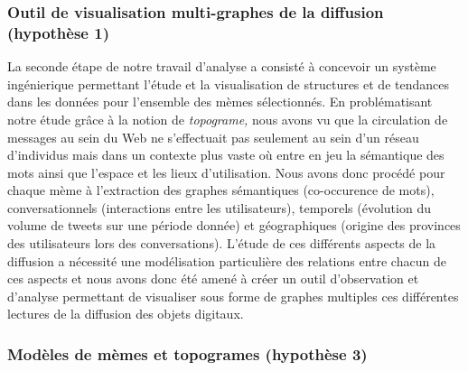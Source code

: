 \subsubsection{Outil de visualisation multi-graphes de la diffusion (hypothèse 1)} 

La seconde étape de notre travail d{\textquoteright}analyse a consisté à concevoir un système ingénierique permettant l{\textquoteright}étude et la visualisation de structures et de tendances dans les données pour l{\textquoteright}ensemble des mèmes sélectionnés. En problématisant notre étude gr\^ace à la notion de \textit{topograme,} nous avons vu que la circulation de messages au sein du Web ne s{\textquoteright}effectuait pas seulement au sein d{\textquoteright}un réseau d{\textquoteright}individus mais dans un contexte plus vaste o\`u entre en jeu la sémantique des mots ainsi que l{\textquoteright}espace et les lieux d{\textquoteright}utilisation. Nous avons donc procédé pour chaque mème à l{\textquoteright}extraction des graphes sémantiques (co-occurence de mots), conversationnels (interactions entre les utilisateurs), temporels (évolution du volume de tweets sur une période donnée) et géographiques (origine des provinces des utilisateurs lors des conversations). L{\textquoteright}étude de ces différents aspects de la diffusion a nécessité une modélisation particulière des relations entre chacun de ces aspects et nous avons donc été amené à créer un outil d{\textquoteright}observation et d{\textquoteright}analyse permettant de visualiser sous forme de graphes multiples ces différentes lectures de la diffusion des objets digitaux.  
  
\subsubsection{Modèles de mèmes et topogrames (hypothèse 3)}
 
